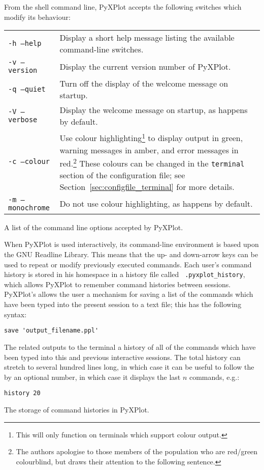 \begin{boxout}
From the shell command line, PyXPlot accepts the following switches which
modify its behaviour:
\vspace{0.5cm}

\begin{tabular}{p{3.5cm}p{8.5cm}}
{\tt -h --help} & Display a short help message listing the available command-line switches.\\
{\tt -v --version} & Display the current version number of PyXPlot.\\
{\tt -q --quiet} & Turn off the display of the welcome message on startup. \\
{\tt -V --verbose} & Display the welcome message on startup, as happens by default. \\
{\tt -c --colour} & Use colour highlighting\footnote{This will only function on terminals which support colour output.} to display output in green, warning messages in amber, and error messages in red.\footnote{The authors apologise to those members of the population who are red/green colourblind, but draws their attention to the following sentence.} These colours can be changed in the {\tt terminal} section of the configuration file; see Section~\ref{sec:configfile_terminal} for more details. \\
{\tt -m --monochrome} & Do not use colour highlighting, as happens by default. \\
\end{tabular}
\caption{A list of the command line options accepted by PyXPlot.}
\label{box:command_switches}
\end{boxout}

\begin{boxout}
When PyXPlot is used interactively, its command-line environment is based upon
the GNU Readline Library. This means that the up- and down-arrow keys can be
used to repeat or modify previously executed commands. Each user's command
history is stored in his homespace in a history file called {\tt
.pyxplot\_history}, which allows PyXPlot to remember command histories between
sessions. PyXPlot's  allows the user a mechanism for saving a
list of the commands which have been typed into the present session to a text
file; this has the following syntax:

\begin{verbatim}
save 'output_filename.ppl'
\end{verbatim}

The related  outputs to the terminal a history of all of the
commands which have been typed into this and previous interactive sessions. The
total history can stretch to several hundred lines long, in which case it can
be useful to follow the  by an optional number, in which case
it displays the last $n$ commands, e.g.:

\begin{verbatim}
history 20
\end{verbatim}
\caption{The storage of command histories in PyXPlot.}
\label{box:command_history}
\end{boxout}

